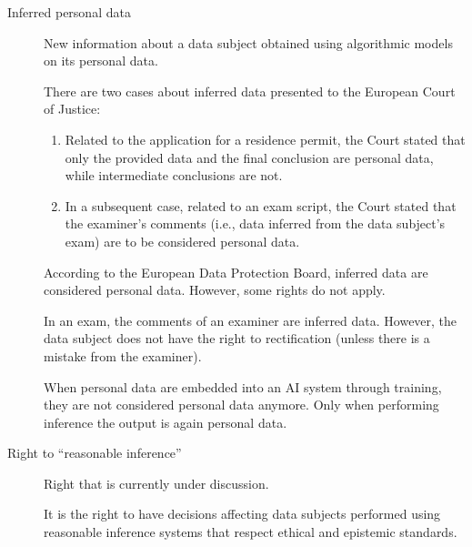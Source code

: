 \begin{description}
    \item[Inferred personal data] 
        New information about a data subject obtained using algorithmic models on its personal data.

    \begin{remark}
        There are two cases about inferred data presented to the European Court of Justice:
        \begin{enumerate}
            \item Related to the application for a residence permit, the Court stated that only the provided data and the final conclusion are personal data, while intermediate conclusions are not.
            \item In a subsequent case, related to an exam script, the Court stated that the examiner's comments (i.e., data inferred from the data subject's exam) are to be considered personal data.
        \end{enumerate}
    \end{remark}
    
    \begin{remark}
        According to the European Data Protection Board, inferred data are considered personal data. However, some rights do not apply.
        
        \indenttbox
        \begin{example}
            In an exam, the comments of an examiner are inferred data. However, the data subject does not have the right to rectification (unless there is a mistake from the examiner).
        \end{example}
    \end{remark}

    \begin{remark}
        When personal data are embedded into an AI system through training, they are not considered personal data anymore. Only when performing inference the output is again personal data.
    \end{remark}


    \item[Right to ``reasonable inference''] 
        Right that is currently under discussion.

        It is the right to have decisions affecting data subjects performed using reasonable inference systems that respect ethical and epistemic standards.


\end{description}

